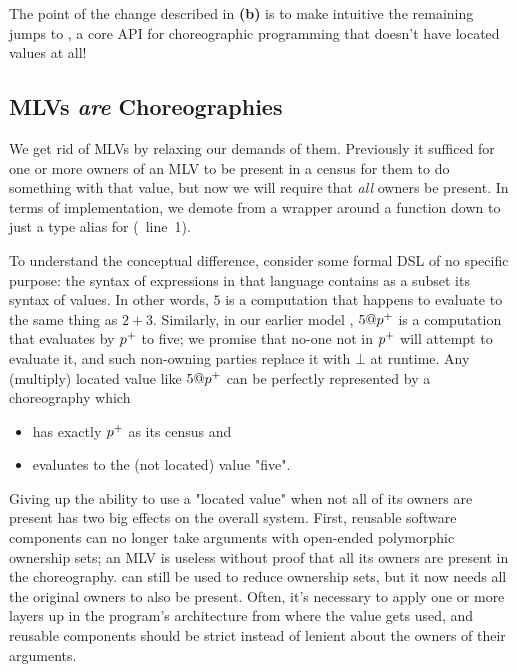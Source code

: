 The point of the change described in \textbf{(b)} is to make intuitive the remaining jumps to \minichor,
a core API for choreographic programming that
doesn't have located values at all!

\subsection{MLVs \emph{are} Choreographies}
\label{sec:minichor-stg3}

We get rid of MLVs by relaxing our demands of them.
Previously it sufficed for one or more owners of an MLV to be present in a census for them to do something with that value,
but now we will require that \emph{all} owners be present.
In terms of implementation,
we demote  from a  wrapper around a function down to just a type alias for 
(~line~1).

To understand the conceptual difference,
consider some formal DSL of no specific purpose:
the syntax of expressions in that language contains as a subset its syntax of values.
In other words, $5$ is a computation that happens to evaluate to the same thing as $2+3$.
Similarly, in our earlier model \HLSCentral, $5@{p^{+}}$ is a computation that evaluates by ${p^{+}}$ to five;
we promise that no-one not in ${p^{+}}$ will attempt to evaluate it, and such non-owning parties replace it with $\bot$ at runtime.
Any (multiply) located value like $5@{p^{+}}$ can be perfectly represented by a choreography which
\begin{itemize}
	\item has exactly ${p^{+}}$ as its census and
	\item evaluates to the (not located) value "five".
\end{itemize}

Giving up the ability to use a "located value" when not all of its owners are present has two big effects on the overall system.
First, reusable software components can no longer take arguments with open-ended polymorphic ownership sets;
an MLV is useless without proof that all its owners are present in the choreography.
 can still be used to reduce ownership sets, but it now needs all the original owners to also be present.
Often, it's necessary to apply  one or more layers up in the program's architecture from where the value gets used,
and reusable components should be strict instead of lenient about the owners of their arguments.

